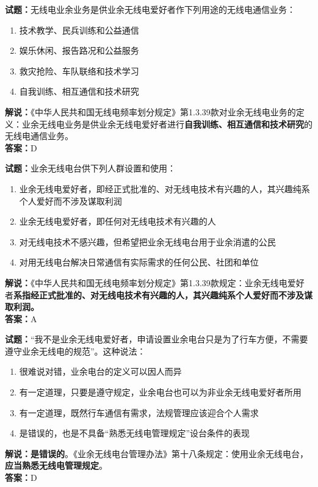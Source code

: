 \documentclass{ctexbook}
\begin{document}
\noindent\textbf{试题：}无线电业余业务是供业余无线电爱好者作下列用途的无线电通信业务：
\begin{enumerate}[leftmargin=3em]
	\item 技术教学、民兵训练和公益通信
	\item 娱乐休闲、报告路况和公益服务
	\item 救灾抢险、车队联络和技术学习
	\item 自我训练、相互通信和技术研究
\end{enumerate}
\noindent\textbf{解说：}《中华人民共和国无线电频率划分规定》第1.3.39款对业余无线电业务的定义：业余无线电业务是供业余无线电爱好者进行\textbf{自我训练、相互通信和技术研究}的无线电通信业务。\\\noindent\textbf{答案：}D



\bigskip


\noindent\textbf{试题：}业余无线电台供下列人群设置和使用：
\begin{enumerate}[leftmargin=3em]
	\item 业余无线电爱好者，即经正式批准的、对无线电技术有兴趣的人，其兴趣纯系个人爱好而不涉及谋取利润
	\item 业余无线电爱好者，即任何对无线电技术有兴趣的人
	\item 对无线电技术不感兴趣，但希望把业余无线电台用于业余消遣的公民
	\item 对用无线电台解决日常通信有实际需求的任何公民、社团和单位
\end{enumerate}
\noindent\textbf{解说：}《中华人民共和国无线电频率划分规定》第1.3.39款规定：业余无线电爱好者\textbf{系指经正式批准的、对无线电技术有兴趣的人，其兴趣纯系个人爱好而不涉及谋取利润。}\\\noindent\textbf{答案：}A

\bigskip


\noindent\textbf{试题：}“我不是业余无线电爱好者，申请设置业余电台只是为了行车方便，不需要遵守业余无线电的规范”。这种说法：
\begin{enumerate}[leftmargin=3em]
	\item 很难说对错，业余电台的定义可以因人而异
	\item 有一定道理，只要是遵守规定，业余电台也可以为非业余无线电爱好者所用
	\item 有一定道理，既然行车通信有需求，法规管理应该迎合个人需求
	\item 是错误的，也是不具备“熟悉无线电管理规定”设台条件的表现
\end{enumerate}
\noindent\textbf{解说：}\textbf{是错误的}。《业余无线电台管理办法》第十八条规定：使用业余无线电台，\textbf{应当熟悉无线电管理规定}。\\\noindent\textbf{答案：}D
\end{document}
